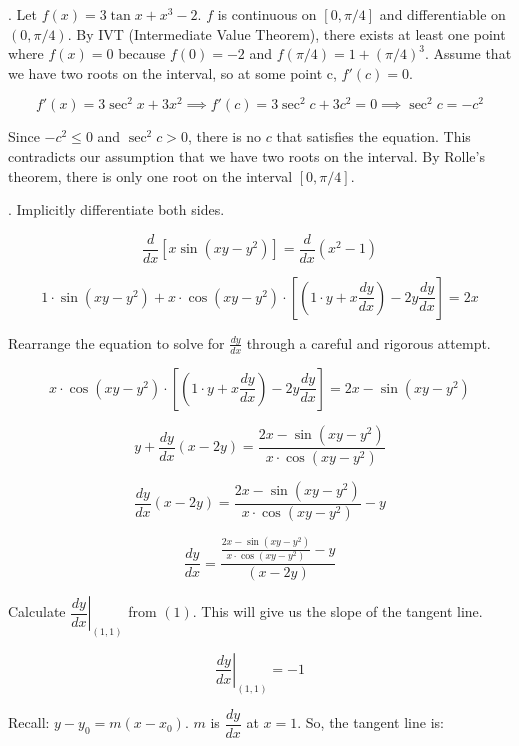 \documentclass{article}
\begin{document}
\hfill

. Let $f(x) = 3\tan x + x^3 -2$. $f$ is continuous on $[0, \pi/4]$ and differentiable on $(0, \pi/4)$. By IVT (Intermediate Value Theorem), there exists at least one point where $f(x) = 0$ because $f(0) = -2$ and $f(\pi/4) = 1 + (\pi/4)^3$. Assume that we have two roots on the interval, so at some point c, $f'(c) = 0$.

\[f'(x) = 3\sec^2x + 3x^2\implies  f'(c) = 3\sec^2c + 3c^2 = 0\implies \sec^2c =-c^2 \]

\hfill

\noindent Since $-c^2 \leq 0$ and $\sec ^2c > 0$, there is no $c$ that satisfies the equation. This contradicts our assumption that we have two roots on the interval. By Rolle's theorem, there is only one root on the interval $[0, \pi/4]$.

\hfill

. Implicitly differentiate both sides.

\[\frac{d}{dx}\left[x \sin\left(xy-y^2\right)\right] = \frac{d}{dx}\left(x^2-1\right) \]

\[1\cdot\sin\left(xy-y^2\right)+x\cdot\cos\left(xy-y^2\right)\cdot\left[\left(1\cdot y+x\frac{dy}{dx}\right)-2y\frac{dy}{dx}\right]=2x\]

\hfill

\noindent Rearrange the equation to solve for $\frac{dy}{dx}$ through a careful and rigorous attempt.

\[x\cdot\cos\left(xy-y^2\right)\cdot\left[\left(1\cdot y+x\frac{dy}{dx}\right)-2y\frac{dy}{dx}\right]=2x-\sin(xy-y^2)\]

\[y+\frac{dy}{dx}(x-2y)=\frac{2x-\sin\left(xy-y^2\right)}{x\cdot\cos\left(xy-y^2\right)}\]

\[\frac{dy}{dx}(x-2y)=\frac{2x-\sin\left(xy-y^2\right)}{x\cdot\cos\left(xy-y^2\right)}-y\]

\hfill

\begin{equation}\frac{dy}{dx}=\frac{\frac{2x-\sin(xy-y^2)}{x\cdot\cos(xy-y^2)}-y}{(x-2y)}\end{equation}

\hfill

\noindent Calculate $\left.\dfrac{dy}{dx}\right|_{(1,1)}$ from $(1)$. This will give us the slope of the tangent line.

\[\left.\frac{dy}{dx}\right|_{(1,1)}=-1\]

\hfill

\noindent Recall: $y-y_0 = m(x-x_0)$. $m$ is $\dfrac{dy}{dx}$ at $x=1$. So, the tangent line is:
\end{document}
